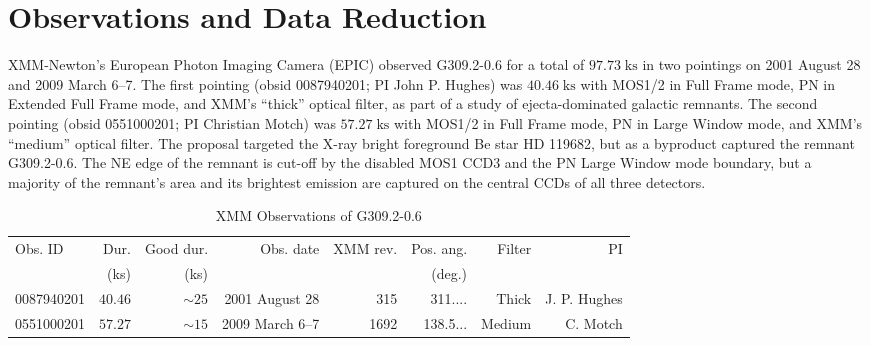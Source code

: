 \documentclass[twocolumn,tighten,trackchanges]{aastex6}
\newcommand*{\mt}{\mathrm}
\newcommand*{\unit}[1]{\;\mt{#1}}  %
\newcommand*{\abt}{\mathord{\sim}} %
\begin{document}
\section{Observations and Data Reduction} \label{sec:obs}


XMM-Newton's European Photon Imaging Camera (EPIC) observed G309.2-0.6 for a
total of $97.73 \unit{ks}$ in two pointings on 2001 August 28 and 2009 March
6--7.  The first pointing (obsid 0087940201; PI John P. Hughes) was $40.46
\unit{ks}$ with MOS1/2 in Full Frame mode, PN in Extended Full Frame mode, and
XMM's ``thick'' optical filter, as part of a study of ejecta-dominated galactic
remnants.
The second pointing (obsid 0551000201; PI Christian Motch) was $57.27
\unit{ks}$  with MOS1/2 in Full Frame mode, PN in Large Window mode, and XMM's
``medium'' optical filter.  The proposal targeted the X-ray bright foreground
Be star HD 119682, but as a byproduct captured the remnant G309.2-0.6.  The NE
edge of the remnant is cut-off by the disabled MOS1 CCD3 and the PN Large
Window mode boundary, but a majority of the remnant's area and its brightest
emission are captured on the central CCDs of all three detectors.

\begin{table*}
    \centering
    \caption{XMM Observations of G309.2-0.6}
    \begin{tabular}{@{}lrrrrrrr@{}}
        \toprule
        Obs. ID & Dur. & Good dur. & Obs. date & XMM rev. & Pos. ang. & Filter & PI \\
                & (ks)     & (ks)                &      &          & (deg.)    &        &    \\
        \midrule
        0087940201 & $40.46$ & $\abt25$ & 2001 August 28 & 315 & 311.... & Thick & J. P. Hughes \\
        0551000201 & $57.27$ & $\abt15$ & 2009 March 6--7 & 1692 & 138.5... & Medium & C. Motch \\
        \bottomrule
    \end{tabular}
\end{table*}

\end{document}
